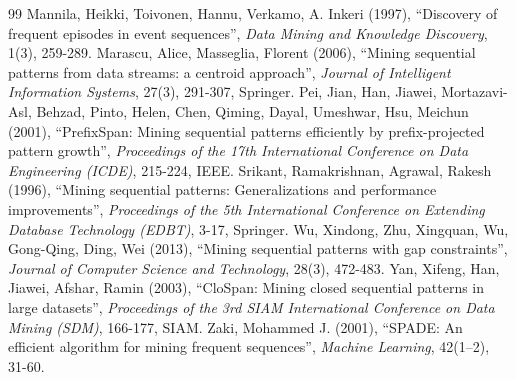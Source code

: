 \begin{thebibliography}{99}
 Mannila, Heikki, Toivonen, Hannu, Verkamo, A. Inkeri (1997), ``Discovery of frequent episodes in event sequences'', \textit{Data Mining and Knowledge Discovery}, 1(3), 259-289.
 Marascu, Alice, Masseglia, Florent (2006), ``Mining sequential patterns from data streams: a centroid approach'', \textit{Journal of Intelligent Information Systems}, 27(3), 291-307, Springer.
 Pei, Jian, Han, Jiawei, Mortazavi-Asl, Behzad, Pinto, Helen, Chen, Qiming, Dayal, Umeshwar, Hsu, Meichun (2001), ``PrefixSpan: Mining sequential patterns efficiently by prefix-projected pattern growth'', \textit{Proceedings of the 17th International Conference on Data Engineering (ICDE)}, 215-224, IEEE.
 Srikant, Ramakrishnan, Agrawal, Rakesh (1996), ``Mining sequential patterns: Generalizations and performance improvements'', \textit{Proceedings of the 5th International Conference on Extending Database Technology (EDBT)}, 3-17, Springer.
 Wu, Xindong, Zhu, Xingquan, Wu, Gong-Qing, Ding, Wei (2013), ``Mining sequential patterns with gap constraints'', \textit{Journal of Computer Science and Technology}, 28(3), 472-483.
 Yan, Xifeng, Han, Jiawei, Afshar, Ramin (2003), ``CloSpan: Mining closed sequential patterns in large datasets'', \textit{Proceedings of the 3rd SIAM International Conference on Data Mining (SDM)}, 166-177, SIAM.
 Zaki, Mohammed J. (2001), ``SPADE: An efficient algorithm for mining frequent sequences'', \textit{Machine Learning}, 42(1--2), 31-60.
\end{thebibliography}